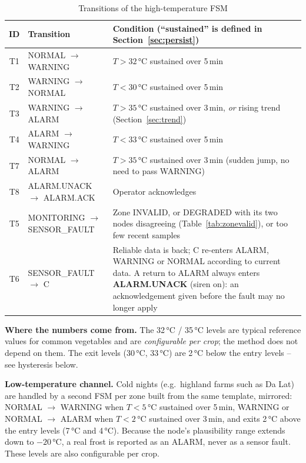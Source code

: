 \documentclass[11pt,a4paper]{report}
\newcommand{\why}[1]{\par\noindent\colorbox{gray!10}{\parbox{\dimexpr\linewidth-2\fboxsep}{\small\textbf{Where the numbers come from.} #1}}\par}
\begin{document}
\begin{table}[htbp]
\centering
\caption{Transitions of the high-temperature FSM}\label{tab:trans}
\small
\begin{tabularx}{\textwidth}{c >{\raggedright\arraybackslash}p{4.3cm} Y}
\toprule
\textbf{ID} & \textbf{Transition} & \textbf{Condition (``sustained'' is defined in Section~\ref{sec:persist})}\\
\midrule
T1 & NORMAL $\to$ WARNING & $T > 32$\,°C sustained over 5\,min\\
T2 & WARNING $\to$ NORMAL & $T < 30$\,°C sustained over 5\,min\\
T3 & WARNING $\to$ ALARM & $T > 35$\,°C sustained over 3\,min, \emph{or} rising trend (Section~\ref{sec:trend})\\
T4 & ALARM $\to$ WARNING & $T < 33$\,°C sustained over 5\,min\\
T7 & NORMAL $\to$ ALARM & $T > 35$\,°C sustained over 3\,min (sudden jump, no need to pass WARNING)\\
T8 & ALARM.UNACK $\to$ ALARM.ACK & Operator acknowledges\\
T5 & MONITORING $\to$ SENSOR\_FAULT & Zone INVALID, or DEGRADED with its two nodes disagreeing (Table~\ref{tab:zonevalid}), or too few recent samples\\
T6 & SENSOR\_FAULT $\to$ C & Reliable data is back; C re-enters ALARM, WARNING or NORMAL according to current data. A return to ALARM always enters \textbf{ALARM.UNACK} (siren on): an acknowledgement given before the fault may no longer apply\\
\bottomrule
\end{tabularx}
\end{table}

\why{The 32\,°C / 35\,°C levels are typical reference values for common vegetables and are \emph{configurable per crop}; the method does not depend on them. The exit levels (30\,°C, 33\,°C) are 2\,°C below the entry levels -- see hysteresis below.}

\textbf{Low-temperature channel.} Cold nights (e.g.\ highland farms such as Da Lat) are handled by a second FSM per zone built from the same template, mirrored: NORMAL $\to$ WARNING when $T < 5$\,°C sustained over 5\,min, WARNING or NORMAL $\to$ ALARM when $T < 2$\,°C sustained over 3\,min, and exits 2\,°C above the entry levels (7\,°C and 4\,°C). Because the node's plausibility range extends down to $-20$\,°C, a real frost is reported as an ALARM, never as a sensor fault. These levels are also configurable per crop.
\end{document}
